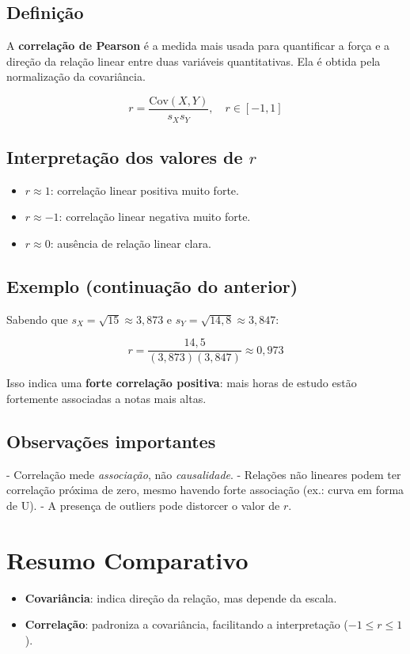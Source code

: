 \subsection*{Definição}
A \textbf{correlação de Pearson} é a medida mais usada para quantificar a força e a direção da relação linear entre duas variáveis quantitativas.  
Ela é obtida pela normalização da covariância.

\begin{FormulaBox}
\[
r = \dfrac{\mathrm{Cov}(X,Y)}{s_X s_Y}, \quad r\in[-1,1]
\]
\end{FormulaBox}

\subsection*{Interpretação dos valores de $r$}
\begin{itemize}[leftmargin=*]
  \item $r \approx 1$: correlação linear positiva muito forte.
  \item $r \approx -1$: correlação linear negativa muito forte.
  \item $r \approx 0$: ausência de relação linear clara.
\end{itemize}

\subsection*{Exemplo (continuação do anterior)}
Sabendo que $s_X=\sqrt{15}\approx 3,873$ e $s_Y=\sqrt{14,8}\approx 3,847$:

\[
r = \frac{14,5}{(3,873)(3,847)} \approx 0,973
\]

Isso indica uma \textbf{forte correlação positiva}: mais horas de estudo estão fortemente associadas a notas mais altas.

\subsection*{Observações importantes}
- Correlação mede \emph{associação}, não \emph{causalidade}.  
- Relações não lineares podem ter correlação próxima de zero, mesmo havendo forte associação (ex.: curva em forma de U).  
- A presença de outliers pode distorcer o valor de $r$.

\section{Resumo Comparativo}
\begin{itemize}[leftmargin=*]
  \item \textbf{Covariância}: indica direção da relação, mas depende da escala.  
  \item \textbf{Correlação}: padroniza a covariância, facilitando a interpretação ($-1 \leq r \leq 1$).  
\end{itemize}

